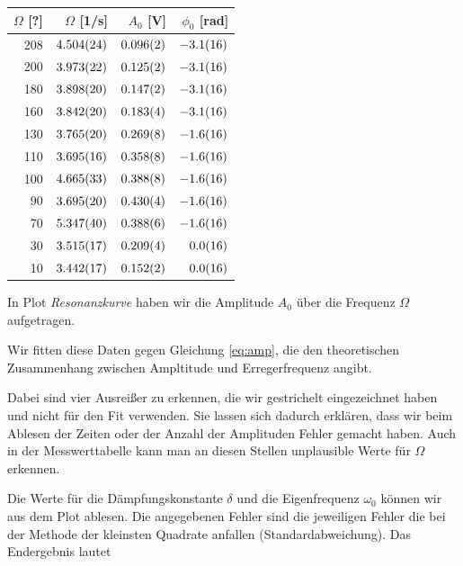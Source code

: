 \documentclass[a4paper,german,12pt,smallheadings]{scrartcl}
\begin{document}
\begin{tabular}{r|r|r|r}
  $\Omega$ [?] & $\Omega$ [1/s] & $A_0$ [V] & $\phi_0$ [rad] \\
  \hline
  208 & $\num{4.504+-0.024}$ & $\num{0.096+-0.002}$ & $\num{-3.1+-1.6}$ \\
  200 & $\num{3.973+-0.022}$ & $\num{0.125+-0.002}$ & $\num{-3.1+-1.6}$ \\
  180 & $\num{3.898+-0.020}$ & $\num{0.147+-0.002}$ & $\num{-3.1+-1.6}$ \\
  160 & $\num{3.842+-0.020}$ & $\num{0.183+-0.004}$ & $\num{-3.1+-1.6}$ \\
  130 & $\num{3.765+-0.020}$ & $\num{0.269+-0.008}$ & $\num{-1.6+-1.6}$ \\
  110 & $\num{3.695+-0.016}$ & $\num{0.358+-0.008}$ & $\num{-1.6+-1.6}$ \\
  100 & $\num{4.665+-0.033}$ & $\num{0.388+-0.008}$ & $\num{-1.6+-1.6}$ \\
  90  & $\num{3.695+-0.020}$ & $\num{0.430+-0.004}$ & $\num{-1.6+-1.6}$ \\
  70  & $\num{5.347+-0.040}$ & $\num{0.388+-0.006}$ & $\num{-1.6+-1.6}$ \\
  30  & $\num{3.515+-0.017}$ & $\num{0.209+-0.004}$ & $\num{ 0.0+-1.6}$ \\
  10  & $\num{3.442+-0.017}$ & $\num{0.152+-0.002}$ & $\num{ 0.0+-1.6}$ \\
\end{tabular}

\vspace{1cm}

In Plot \textit{Resonanzkurve} haben wir die Amplitude $A_0$ über die Frequenz
$\Omega$ aufgetragen.

Wir fitten diese Daten gegen Gleichung \ref{eq:amp}, die den theoretischen
Zusammenhang zwischen Ampltitude und Erregerfrequenz angibt.

Dabei sind vier Ausreißer zu erkennen, die wir gestrichelt eingezeichnet haben
und nicht für den Fit verwenden. Sie lassen sich dadurch erklären, dass wir
beim Ablesen der Zeiten oder der Anzahl der Amplituden Fehler gemacht haben.
Auch in der Messwerttabelle kann man an diesen Stellen unplausible Werte für
$\Omega$ erkennen.

Die Werte für die Dämpfungskonstante $\delta$ und die Eigenfrequenz $\omega_0$
können wir aus dem Plot ablesen.  Die angegebenen Fehler sind die jeweiligen
Fehler die bei der Methode der kleinsten Quadrate anfallen
(Standardabweichung). Das Endergebnis lautet
\end{document}
